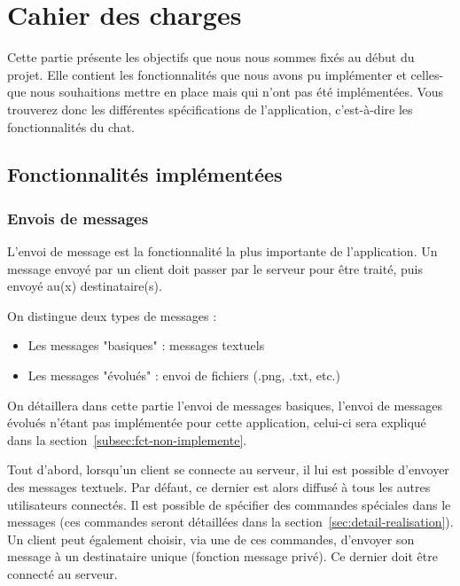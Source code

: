 \section{Cahier des charges}
\label{sec:cahier-des-charges}

    Cette partie présente les objectifs que nous nous sommes fixés au début du projet. Elle contient les fonctionnalités que nous avons pu implémenter et celles-que nous souhaitions mettre en place mais qui n'ont pas été implémentées. Vous trouverez donc les différentes spécifications de l'application, c'est-à-dire les fonctionnalités du chat.

    \subsection{Fonctionnalités implémentées}
    
        \subsubsection{Envois de messages}
            L'envoi de message est la fonctionnalité la plus importante de l'application. Un message envoyé par un client doit passer par le serveur pour être traité, puis envoyé au(x) destinataire(s).
            
            On distingue deux types de messages :            
            \begin{itemize}
                \item Les messages "basiques" : messages textuels
                \item Les messages "évolués" : envoi de fichiers (.png, .txt, etc.)
            \end{itemize}
            
            On détaillera dans cette partie l'envoi de messages basiques, l'envoi de messages évolués n'étant pas implémentée pour cette application, celui-ci sera expliqué dans la section~\ref{subsec:fct-non-implemente}.
            
            Tout d'abord, lorsqu'un client se connecte au serveur, il lui est possible d'envoyer des messages textuels. Par défaut, ce dernier est alors diffusé à tous les autres utilisateurs connectés. Il est possible de spécifier des commandes spéciales dans le messages (ces commandes seront détaillées dans la section~\ref{sec:detail-realisation}). Un client peut également choisir, via une de ces commandes, d'envoyer son message à un destinataire unique (fonction message privé). Ce dernier doit être connecté au serveur.          
            
